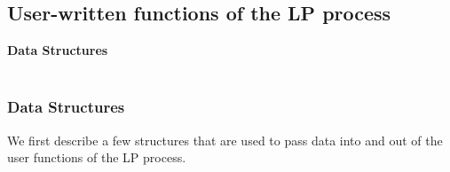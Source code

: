 \subsection{User-written functions of the LP process}
\label{user-written-lp}
\begin{latexonly}
{\large \bf Data Structures}\\
\\
\end{latexonly}
\begin{htmlonly}
\subsubsection{Data Structures}
\end{htmlonly}
\noindent We first describe a few structures that are used to pass
data into and out of the user functions of the LP process.

